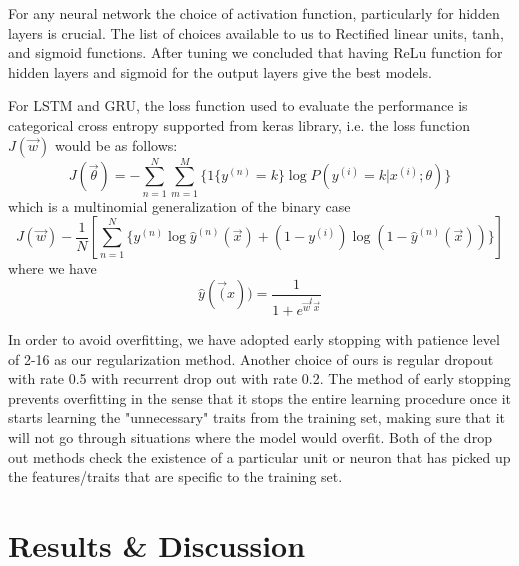 \documentclass[comsoc,conference]{IEEEtran}
\begin{document}
For any neural network the choice of activation function, particularly for hidden layers is crucial. The list of choices available to us to Rectified linear units, tanh, and sigmoid functions. After tuning we concluded that having ReLu function for hidden layers and sigmoid for the output layers give the best models.

For LSTM and GRU, the loss function used to evaluate the performance is categorical cross entropy supported from keras library, i.e. the loss function $J(\vec{w})$ would be as follows:
\[
J(\vec{\theta}) = - \sum_{n=1}^N\sum_{m=1}^M\{1\{y^{(n)}=k\}\log P(y^{(i)} = k|x^{(i)}; \theta)\}
\]
\noindent which is a multinomial generalization of the binary case
\[
J(\vec{w})- \frac{1}{N} [ \sum_{n=1}^N \{y^{(n)} \log \hat{y}^{(n)}(\vec{x}) + (1-y^{(i)})\log(1-\hat{y}^{(n)}(\vec{x})) \}]
\]
where we have 
\[
\hat{y}(\vec(x)) = \frac{1}{1+e^{\vec{w}^t\vec{x}}}
\]

In order to avoid overfitting, we have adopted early stopping with patience level of 2-16 as our regularization method. Another choice of ours is regular dropout with rate 0.5 with recurrent drop out with rate 0.2. The method of early stopping prevents overfitting in the sense that it stops the entire learning procedure once it starts learning the "unnecessary" traits from the training set, making sure that it will not go through situations where the model would overfit. Both of the drop out methods check the existence of a particular unit or neuron that has picked up the features/traits that are specific to the training set.

\section{Results \& Discussion}
\end{document}
